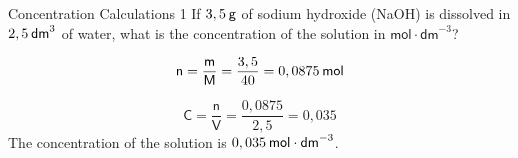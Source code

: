       \begin{wex}{ Concentration Calculations 1 }
{
      \label{m38712*probfhsst!!!underscore!!!id1654}
      \label{m38712*id283003}If $3,5\phantom{\rule{2pt}{0ex}}\mathsf{g}$ of sodium hydroxide (NaOH) is dissolved in $2,5\phantom{\rule{2pt}{0ex}}{\mathsf{dm}}^{3}$ of water, what is the concentration of the solution in $\mathsf{mol}\ensuremath{\cdot}{\mathsf{dm}}^{-3}$? 
      \vspace{5pt}}
{
      \label{m38712*id283067}\nopagebreak\noindent{}
    \begin{equation*}
    \mathsf{n}=\frac{\mathsf{m}}{\mathsf{M}}=\frac{3,5}{40}=0,0875\phantom{\rule{2pt}{0ex}}\mathsf{mol}
      \end{equation*}
      \label{m38712*id283121}\nopagebreak\noindent{}
        
    \begin{equation*}
    \mathsf{C}=\frac{\mathsf{n}}{\mathsf{V}}=\frac{0,0875}{2,5}=0,035
      \end{equation*}
      \label{m38712*id283169}The concentration of the solution is $0,035\phantom{\rule{2pt}{0ex}}\mathsf{mol}\ensuremath{\cdot}{\mathsf{dm}}^{-3}$.
 
}
    \end{wex}

    \noindent
\par
\vspace{-2cm} 

